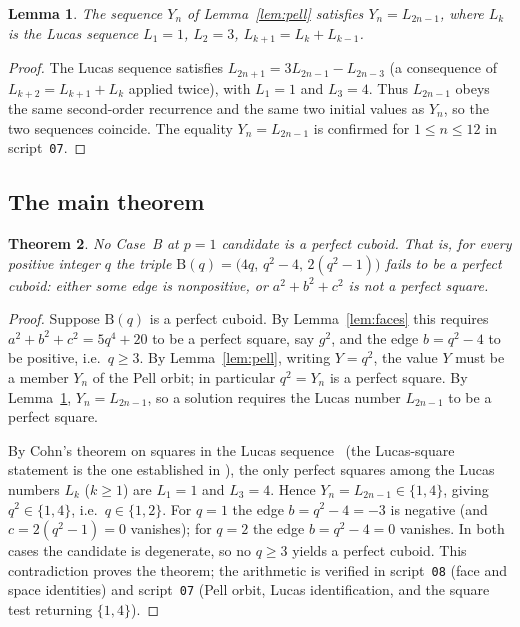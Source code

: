 \documentclass[11pt,reqno]{amsart}
\theoremstyle{plain}
\newtheorem{theorem}{Theorem}[section]
\newtheorem{lemma}[theorem]{Lemma}
\theoremstyle{definition}
\begin{document}
\begin{lemma}\label{lem:lucas}
The sequence $Y_n$ of Lemma~\ref{lem:pell} satisfies $Y_n=L_{2n-1}$, where
$L_k$ is the Lucas sequence $L_1=1$, $L_2=3$, $L_{k+1}=L_k+L_{k-1}$.
\end{lemma}

\begin{proof}
The Lucas sequence satisfies $L_{2n+1}=3L_{2n-1}-L_{2n-3}$ (a consequence of
$L_{k+2}=L_{k+1}+L_k$ applied twice), with $L_1=1$ and $L_3=4$. Thus
$L_{2n-1}$ obeys the same second-order recurrence and the same two initial
values as $Y_n$, so the two sequences coincide. The equality $Y_n=L_{2n-1}$ is
confirmed for $1\le n\le 12$ in script~\texttt{07}.
\end{proof}

\subsection{The main theorem}

\begin{theorem}\label{thm:main}
No Case~B at $p=1$ candidate is a perfect cuboid. That is, for every positive
integer $q$ the triple $\mathrm{B}(q)=\bigl(4q,\,q^2-4,\,2(q^2-1)\bigr)$ fails
to be a perfect cuboid: either some edge is nonpositive, or $a^2+b^2+c^2$ is not
a perfect square.
\end{theorem}

\begin{proof}
Suppose $\mathrm{B}(q)$ is a perfect cuboid. By Lemma~\ref{lem:faces} this
requires $a^2+b^2+c^2=5q^4+20$ to be a perfect square, say $g^2$, and the edge
$b=q^2-4$ to be positive, i.e.\ $q\ge3$. By Lemma~\ref{lem:pell}, writing
$Y=q^2$, the value $Y$ must be a member $Y_n$ of the Pell orbit; in particular
$q^2=Y_n$ is a perfect square. By Lemma~\ref{lem:lucas}, $Y_n=L_{2n-1}$, so a
solution requires the Lucas number $L_{2n-1}$ to be a perfect square.

By Cohn's theorem on squares in the Lucas sequence~\cite{cohn,cohnlucas} (the
Lucas-square statement is the one established in
\cite{cohnlucas}), the only perfect
squares among the Lucas numbers $L_k$ ($k\ge1$) are $L_1=1$ and $L_3=4$. Hence
$Y_n=L_{2n-1}\in\{1,4\}$, giving $q^2\in\{1,4\}$, i.e.\ $q\in\{1,2\}$. For $q=1$
the edge $b=q^2-4=-3$ is negative (and $c=2(q^2-1)=0$ vanishes); for $q=2$ the
edge $b=q^2-4=0$ vanishes. In both cases the candidate is degenerate, so no
$q\ge3$ yields a perfect cuboid. This contradiction proves the theorem; the
arithmetic is verified in script~\texttt{08} (face and space identities) and
script~\texttt{07} (Pell orbit, Lucas identification, and the square test
returning $\{1,4\}$).
\end{proof}
\end{document}
